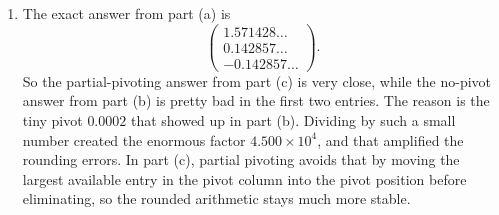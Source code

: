 \documentclass[10pt]{extarticle}
\begin{document}
\begin{enumerate}[label=(\alph*)]
Back substitution from this upper-triangular system gives
\[
z=\frac{-0.1668}{1.167}=-0.1429,
\]
\[
-4.500y-z=-0.5000
\qquad \Longrightarrow \qquad
y=0.1429,
\]
and then
\[
2.000x-y=3.000
\qquad \Longrightarrow \qquad
x=1.572.
\]
So with partial pivoting we get
\[
\boxed{
\begin{pmatrix}
x\\
y\\
z
\end{pmatrix}
\approx
\begin{pmatrix}
1.572\\
0.1429\\
-0.1429
\end{pmatrix}}.
\]

\item The exact answer from part (a) is
\[
\begin{pmatrix}
1.571428\ldots\\
0.142857\ldots\\
-0.142857\ldots
\end{pmatrix}.
\]
So the partial-pivoting answer from part (c) is very close, while the no-pivot answer from part (b) is pretty bad in the first two entries. The reason is the tiny pivot $0.0002$ that showed up in part (b). Dividing by such a small number created the enormous factor $4.500\times 10^4$, and that amplified the rounding errors. In part (c), partial pivoting avoids that by moving the largest available entry in the pivot column into the pivot position before eliminating, so the rounded arithmetic stays much more stable.
\end{enumerate}
\end{document}
